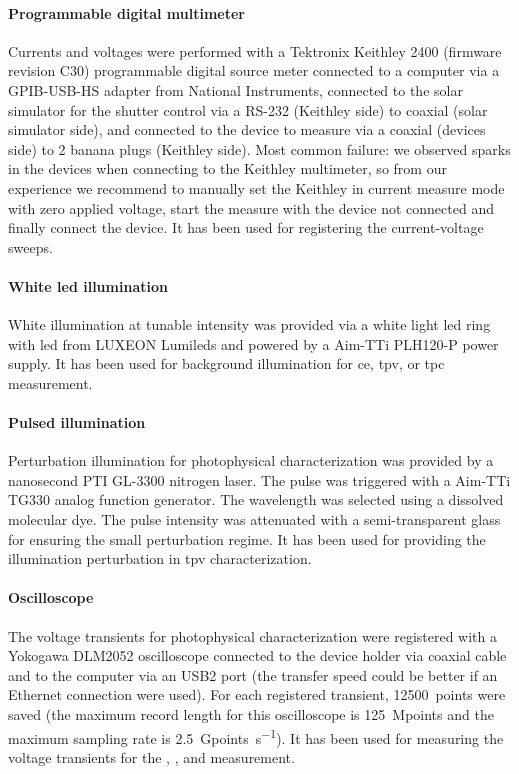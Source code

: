 \paragraph{Programmable digital multimeter} Currents and voltages were performed with a Tektronix Keithley 2400 (firmware revision C30) programmable digital source meter connected to a computer via a GPIB-USB-HS adapter from National Instruments, connected to the solar simulator for the shutter control via a RS-232 (Keithley side) to coaxial (solar simulator side), and connected to the device to measure via a coaxial (devices side) to 2 banana plugs (Keithley side).
Most common failure: we observed sparks in the devices when connecting to the Keithley multimeter, so from our experience we recommend to manually set the Keithley in current measure mode with zero applied voltage, start the measure with the device not connected and finally connect the device.
It has been used for registering the current-voltage sweeps.

\paragraph{White \gls{led} illumination} White illumination at tunable intensity was provided via a white light \gls{led} ring with \gls{led} from LUXEON Lumileds and powered by a Aim-TTi PLH120-P power supply.
It has been used for background illumination for \acrfull{ce}, \acrfull{tpv}, or \acrfull{tpc} measurement.

\paragraph{Pulsed illumination} Perturbation illumination for photophysical characterization was provided by a nanosecond PTI GL-3300 nitrogen laser. The pulse was triggered with a Aim-TTi TG330 analog function generator. The wavelength was selected using a dissolved molecular dye. The pulse intensity was attenuated with a semi-transparent glass for ensuring the small perturbation regime.
It has been used for providing the illumination perturbation in \acrshort{tpv} characterization.

\paragraph{Oscilloscope} The voltage transients for photophysical characterization were registered with a Yokogawa DLM2052 oscilloscope connected to the device holder via coaxial cable and to the computer via an USB2 port (the transfer speed could be better if an Ethernet connection were used). For each registered transient, \SI{12500}{points} were saved (the maximum record length for this oscilloscope is \SI{125}{Mpoints} and the maximum sampling rate is \SI{2.5}{Gpoints\per\s}).
It has been used for measuring the voltage transients for the , , and  measurement.

